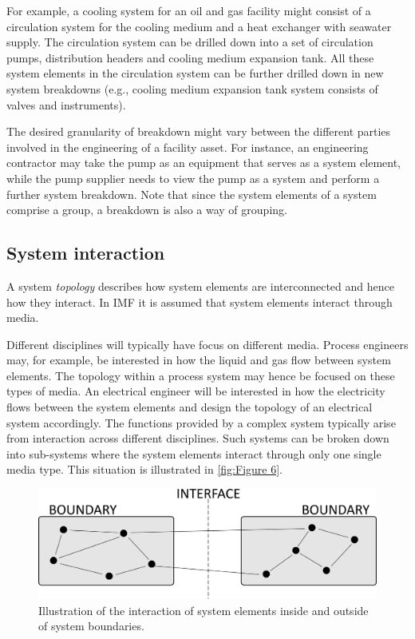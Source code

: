\documentclass[../main.tex]{subfiles}
\begin{document}
For example, a cooling system for an oil and gas facility might consist of a circulation system for the cooling medium and a heat
exchanger with seawater supply. The circulation system can be drilled down into a set of circulation pumps,
distribution headers and cooling medium expansion tank. All these system elements in the circulation system can be
further drilled down in new system breakdowns (e.g., cooling medium expansion tank system consists of valves and
instruments). 

The desired granularity of breakdown might vary between the different parties involved in the engineering of a facility asset. 
For instance, an engineering contractor may take the pump as an equipment that serves as a system element, while the pump supplier needs to view the pump as a system and perform a further system breakdown. Note that since the system elements of a system comprise a group, a breakdown is also a way of grouping.

\subsection{System interaction}
A system \textit{topology} describes how system elements are interconnected and hence how they interact. In IMF it is assumed
that system elements interact through media. 

Different disciplines will typically have focus on different media. Process engineers may, for example, be interested in how
the liquid and gas flow between system elements. The topology within a process system may hence be focused on these
types of media. An electrical engineer will be interested in how the electricity flows between the system elements
and design the topology of an electrical system accordingly.
The functions provided by a complex system   typically arise from interaction across different disciplines.
Such systems can
be broken down into sub-systems where the system elements interact through only one single media type. This situation is illustrated in
\autoref{fig:Figure 6}. 

\begin{figure}[htb]
  \centering
  \includegraphics[width=.7\textwidth]{img/IMFmanual-img006.png}
  \caption{Illustration of the interaction of system elements
    inside and outside of system boundaries.}
  \label{fig:Figure 6}
\end{figure}
\end{document}
